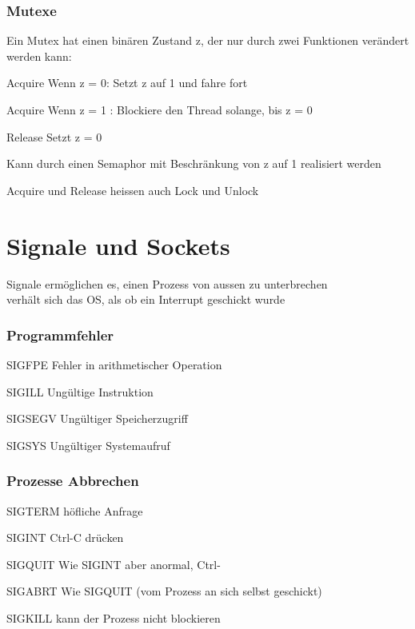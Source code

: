 \begin{multicols*}{5}
\subsubsection{Mutexe}
\begin{compactitem}[$\bullet$]
	\item Ein Mutex hat einen binären Zustand z, der nur durch zwei Funktionen verändert werden kann:
	\item \textcolor{h}{Acquire} Wenn z = 0: Setzt z auf 1 und fahre fort
	\item \textcolor{h}{Acquire} Wenn z = 1 : Blockiere den Thread solange, bis z = 0
	\item \textcolor{h}{Release} Setzt z = 0
	\item Kann durch einen Semaphor mit Beschränkung von z auf 1 realisiert werden 
	\item Acquire und Release heissen auch Lock und Unlock
\end{compactitem}

\vspace{-5pt}






\section{Signale und Sockets}
	Signale ermöglichen es, einen Prozess von aussen zu unterbrechen\\
	verhält sich das OS, als ob ein Interrupt geschickt wurde


	\subsubsection{Programmfehler}
	\begin{compactitem}[$\bullet$]
		\item \textcolor{h}{SIGFPE} Fehler in arithmetischer Operation
		\item \textcolor{h}{SIGILL} Ungültige Instruktion 
		\item \textcolor{h}{SIGSEGV} Ungültiger Speicherzugriff
		\item \textcolor{h}{SIGSYS} Ungültiger Systemaufruf
	\end{compactitem}

	\subsubsection{Prozesse Abbrechen}
	\begin{compactitem}[$\bullet$]
		\item \textcolor{h}{SIGTERM} höfliche Anfrage
		\item \textcolor{h}{SIGINT} Ctrl-C drücken
		\item \textcolor{h}{SIGQUIT} Wie SIGINT aber anormal, Ctrl-\ 
		\item \textcolor{h}{SIGABRT} Wie SIGQUIT (vom Prozess an sich selbst geschickt)
		\item \textcolor{h}{SIGKILL} kann der Prozess nicht blockieren
	\end{compactitem}



\end{multicols*}
